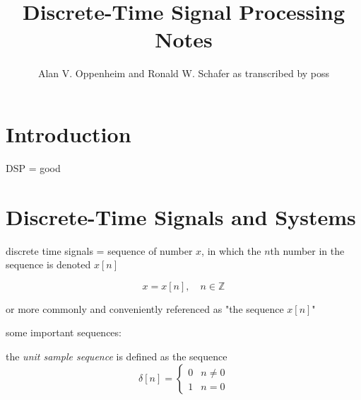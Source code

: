 \documentclass{article}
\title{Discrete-Time Signal Processing Notes}
\author{Alan V. Oppenheim and Ronald W. Schafer as transcribed by poss}
\begin{document}
\maketitle{}

\section{Introduction}

DSP = good

\section{Discrete-Time Signals and Systems}

discrete time signals = sequence of number \(x\), in which the \(n\)th number in the sequence is denoted \(x[n]\)

\[
	x = {x[n]}, \quad n \in \mathbb{Z} 
\]

or more commonly and conveniently referenced as "the sequence \(x[n]\)"


some important sequences:


the \textit{unit sample sequence} is defined as the sequence
\[
	\delta{}[n] =
	\begin{cases} 
		0 & n \neq 0 \\
		1 & n = 0
	\end{cases}
\]
\end{document}
